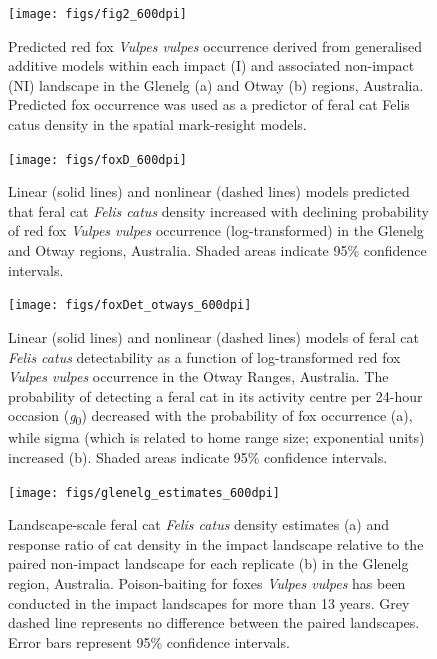 \documentclass[]{elsarticle} %
\begin{document}
\newpage

\begin{figure}
\texttt{[image: figs/fig2\_600dpi]} \caption{Predicted red fox \textit{Vulpes vulpes} occurrence derived from generalised additive models within each impact (I) and associated non-impact (NI) landscape in the Glenelg (a) and Otway (b) regions, Australia. Predicted fox occurrence was used as a predictor of feral cat Felis catus density in the spatial mark-resight models.}\label{fig:foxplot}
\end{figure}

\newpage

\begin{figure}
\texttt{[image: figs/foxD\_600dpi]} \caption{Linear (solid lines) and nonlinear (dashed lines) models predicted that feral cat \textit{Felis catus} density increased with declining probability of red fox \textit{Vulpes vulpes} occurrence (log-transformed) in the Glenelg and Otway regions, Australia. Shaded areas indicate 95\% confidence intervals.}\label{fig:dcor}
\end{figure}

\newpage

\begin{figure}
\texttt{[image: figs/foxDet\_otways\_600dpi]} \caption{Linear (solid lines) and nonlinear (dashed lines) models of feral cat \textit{Felis catus} detectability as a function of log-transformed red fox \textit{Vulpes vulpes} occurrence in the Otway Ranges, Australia. The probability of detecting a feral cat in its activity centre per 24-hour occasion (\textit{g}\textsubscript{0}) decreased with the probability of fox occurrence (a), while sigma (which is related to home range size; exponential units) increased (b). Shaded areas indicate 95\% confidence intervals.}\label{fig:detcor}
\end{figure}

\newpage

\begin{figure}
\texttt{[image: figs/glenelg\_estimates\_600dpi]} \caption{Landscape-scale feral cat \textit{Felis catus} density estimates (a) and response ratio of cat density in the impact landscape relative to the paired non-impact landscape for each replicate (b) in the Glenelg region, Australia. Poison-baiting for foxes \textit{Vulpes vulpes} has been conducted in the impact landscapes for more than 13 years. Grey dashed line represents no difference between the paired landscapes. Error bars represent 95\% confidence intervals.}\label{fig:diffg}
\end{figure}
\end{document}
